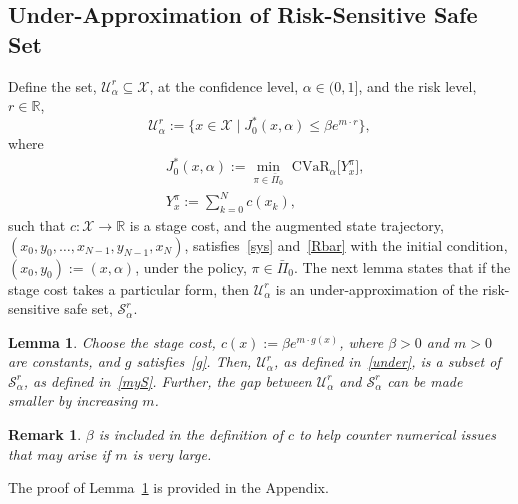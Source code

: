 \documentclass[letterpaper, 10 pt, conference]{ieeeconf}  %
\newtheorem{lemma}{Lemma}
\newtheorem{remark}{Remark}
\begin{document}
\subsection{Under-Approximation of Risk-Sensitive Safe Set}
Define the set, $\mathcal{U}_\alpha^r \subseteq \mathcal{X}$,
at the confidence level, $\alpha \in (0,1]$, and the risk level, $r \in \mathbb{R}$,
%
\begin{equation}\label{under}
\mathcal{U}_\alpha^r := \{x \in \mathcal{X} \mid J_0^*(x,\alpha) \leq \beta e^{m\cdot r} \},
\end{equation}
%
where
%
\begin{equation}\begin{aligned}
& J_0^*(x,\alpha) := {\underset{\pi \in \bar{\Pi}_0}\min} \text{ CVaR}_\alpha \big[ Y_x^\pi \big],\\
& Y_x^\pi := \textstyle\sum_{k=0}^N c(x_k),
\end{aligned}\label{J0}\end{equation}
%
such that $c : \mathcal{X} \to \mathbb{R}$ is a stage cost, and the augmented state trajectory, $(x_0, y_0, \dots, x_{N-1}, y_{N-1}, x_N)$,
satisfies~\eqref{sys} and~\eqref{Rbar} with the initial condition, $(x_0, y_0) := (x, \alpha)$, under the policy, $\pi \in \bar{\Pi}_0$.
The next lemma states that if the stage cost takes a particular form, then $\mathcal{U}_\alpha^r$ is an under-approximation of the risk-sensitive safe set, $\mathcal{S}_\alpha^r$.   
\begin{lemma}\label{lemma2}
Choose the stage cost, $c(x) := \beta e^{m\cdot g(x)}$, where $\beta > 0$ and $m > 0$ are constants, and $g$ satisfies~\eqref{g}.
Then, $\mathcal{U}_\alpha^r$, as defined in~\eqref{under}, is a subset of $\mathcal{S}_\alpha^r$, as defined in~\eqref{myS}. 
Further, the gap between $\mathcal{U}_\alpha^r$ and $\mathcal{S}_\alpha^r$ can be made smaller by increasing $m$.
\end{lemma}
\begin{remark} $\beta$ is included in the definition of $c$ to help counter numerical issues that may arise if $m$ is very large. \end{remark}
The proof of Lemma~\ref{lemma2} is provided in the Appendix.
%
\end{document}
